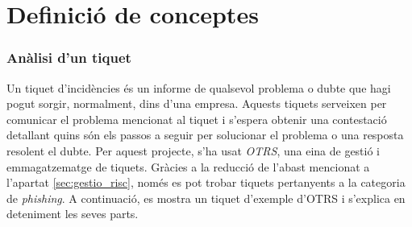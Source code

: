 \section{Definició de conceptes}
\subsubsection{Anàlisi d'un tiquet}
Un tiquet d'incidències és un informe de qualsevol problema o dubte que hagi pogut sorgir, normalment, dins d'una empresa. Aquests tiquets serveixen per comunicar el problema mencionat al tiquet i s'espera obtenir una contestació detallant quins són els passos a seguir per solucionar el problema o una resposta resolent el dubte. Per aquest projecte, s'ha usat \textit{OTRS}, una eina de gestió i emmagatzematge de tiquets. Gràcies a la reducció de l'abast mencionat a l'apartat \ref{sec:gestio_risc}, només es pot trobar tiquets pertanyents a la categoria de \textit{phishing}. A continuació, es mostra un tiquet d'exemple d'OTRS i s'explica en deteniment les seves parts.

